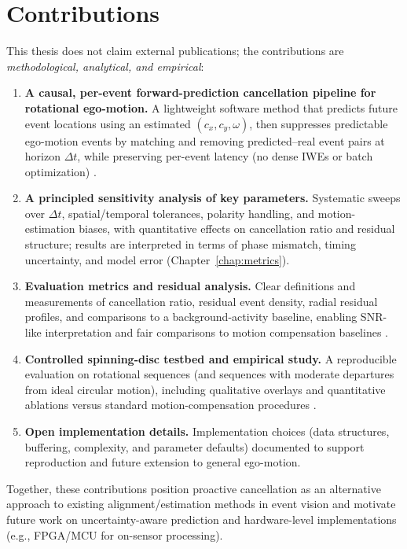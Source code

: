 \section{Contributions}
\label{sec:contributions}

This thesis does not claim external publications; the contributions are \emph{methodological, analytical, and empirical}:

\begin{enumerate}
    \item \textbf{A causal, per-event forward-prediction cancellation pipeline for rotational ego-motion.} A lightweight software method that predicts future event locations using an estimated $(c_x,c_y,\omega)$, then suppresses predictable ego-motion events by matching and removing predicted–real event pairs at horizon $\Delta t$, while preserving per-event latency (no dense IWEs or batch optimization) \cite{Bardow2016SOFIE,Gallego2018CMax}.
    \item \textbf{A principled sensitivity analysis of key parameters.} Systematic sweeps over $\Delta t$, spatial/temporal tolerances, polarity handling, and motion-estimation biases, with quantitative effects on cancellation ratio and residual structure; results are interpreted in terms of phase mismatch, timing uncertainty, and model error (Chapter~\ref{chap:metrics}).
    \item \textbf{Evaluation metrics and residual analysis.} Clear definitions and measurements of cancellation ratio, residual event density, radial residual profiles, and comparisons to a background-activity baseline, enabling SNR-like interpretation and fair comparisons to motion compensation baselines \cite{Gallego2020Survey,Bardow2016SOFIE,Gallego2018CMax,Xu2020TCI}.
    \item \textbf{Controlled spinning-disc testbed and empirical study.} A reproducible evaluation on rotational sequences (and sequences with moderate departures from ideal circular motion), including qualitative overlays and quantitative ablations versus standard motion-compensation procedures \cite{Gallego2018CMax,Bardow2016SOFIE,Stoffregen2019Segmentation}.
    \item \textbf{Open implementation details.} Implementation choices (data structures, buffering, complexity, and parameter defaults) documented to support reproduction and future extension to general ego-motion.
\end{enumerate}
Together, these contributions position proactive cancellation as an alternative approach to existing alignment/estimation methods in event vision \cite{Bardow2016SOFIE,Rebecq2017EVO,Gallego2018CMax} and motivate future work on uncertainty-aware prediction and hardware-level implementations (e.g., FPGA/MCU for on-sensor processing).

